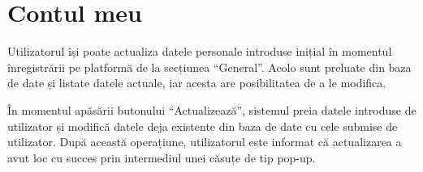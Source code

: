 \documentclass[12pt,a4paper]{report}
\begin{document}
\section{Contul meu}
\par
Utilizatorul își poate actualiza datele personale introduse inițial în momentul înregistrării pe platformă de la secțiunea  “General”. Acolo sunt preluate din baza de date și listate datele actuale, iar acesta are posibilitatea de a le modifica.
\\
\par
În momentul apăsării butonului “Actualizează”, sistemul preia datele introduse de utilizator și modifică datele deja existente din baza de date cu cele submise de utilizator. După această operațiune, utilizatorul este informat că actualizarea a avut loc cu succes prin intermediul unei căsuțe de tip pop-up.
\\
\end{document}
